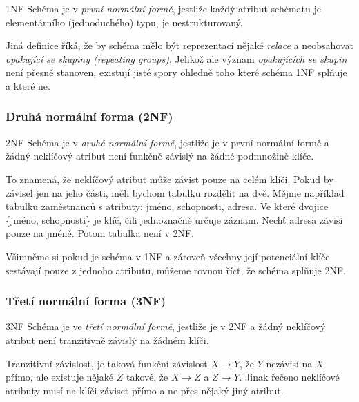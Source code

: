 \begin{definiceN}{1NF} Schéma je v \emph{první normální formě}, jestliže každý atribut
schématu je elementárního (jednoduchého) typu, je nestrukturovaný.
\end{definiceN}

Jiná definice říká, že by schéma mělo být reprezentací nějaké \emph{relace} a
neobsahovat \emph{opakující se skupiny (repeating groups)}. Jelikož ale význam
\emph{opakujících se skupin} není přesně stanoven, existují jisté spory ohledně
toho které schéma 1NF splňuje a které ne.

\subsubsection*{Druhá normální forma (2NF)}

\begin{definiceN}{2NF}
Schéma je v \emph{druhé normální formě}, jestliže je v první normální formě a
žádný neklíčový atribut není funkčně závislý na žádné podmnožině klíče.
\end{definiceN}

To znamená, že neklíčový atribut může závist pouze na celém klíči. Pokud by
závisel jen na jeho části, měli bychom tabulku rozdělit na dvě. Mějme například
tabulku zaměstnanců s atributy: jméno, schopnosti, adresa. Ve které dvojice
\{jméno, schopnosti\} je klíč, čili jednoznačně určuje záznam. Nechť adresa
závisí pouze na jméně. Potom tabulka není v 2NF.

\begin{poznamka} Všimněme si pokud je schéma v 1NF a zároveň všechny její
potenciální klíče sestávají pouze z jednoho atributu, můžeme rovnou říct, že
schéma splňuje 2NF. \end{poznamka}

\subsubsection*{Třetí normální forma (3NF)}

\begin{definiceN}{3NF}
Schéma je ve \emph{třetí normální formě}, jestliže je v 2NF a žádný neklíčový
atribut není tranzitivně závislý na žádném klíči.
\end{definiceN}

Tranzitivní závislost, je taková funkční závislost $X \rightarrow Y$, že $Y$
nezávisí na $X$ přímo, ale existuje nějaké $Z$ takové, že $X \rightarrow Z$ a $Z
\rightarrow Y$. Jinak řečeno neklíčové atributy musí na klíči záviset přímo a ne
přes nějaký jiný atribut.

